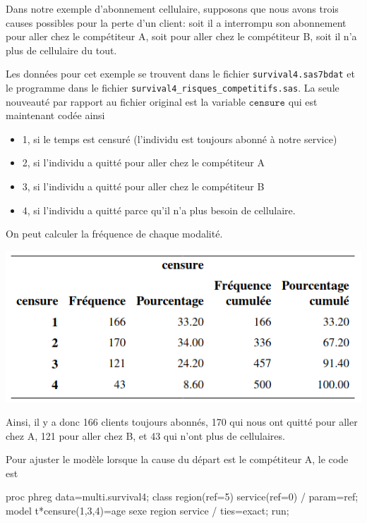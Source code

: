 \documentclass[
  11pt,
  letterpaper,
]{book}
\newenvironment{Shaded}{\begin{snugshade}}{\end{snugshade}}
\newcommand{\NormalTok}[1]{#1}
\providecommand{\tightlist}{%
  \setlength{\itemsep}{0pt}\setlength{\parskip}{0pt}}
\theoremstyle{definition}
\theoremstyle{definition}
\theoremstyle{definition}
\theoremstyle{definition}
\theoremstyle{remark}
\begin{document}
Dans notre exemple d'abonnement cellulaire, supposons que nous avons trois causes possibles pour la perte d'un client: soit il a interrompu son abonnement pour aller chez le compétiteur A, soit pour aller chez le compétiteur B, soit il n'a plus de cellulaire du tout.

Les données pour cet exemple se trouvent dans le fichier \texttt{survival4.sas7bdat} et le programme dans le fichier \texttt{survival4\_risques\_competitifs.sas}. La seule nouveauté par rapport au fichier original est la variable \(\texttt{censure}\) qui est maintenant codée ainsi

\begin{itemize}
\tightlist
\item
  1, si le temps est censuré (l'individu est toujours abonné à notre service)
\item
  2, si l'individu a quitté pour aller chez le compétiteur A
\item
  3, si l'individu a quitté pour aller chez le compétiteur B
\item
  4, si l'individu a quitté parce qu'il n'a plus besoin de cellulaire.
\end{itemize}

On peut calculer la fréquence de chaque modalité.

\begin{center}\includegraphics[width=0.65\linewidth]{figures/05-survie-e23} \end{center}

Ainsi, il y a donc 166 clients toujours abonnés, 170 qui nous ont quitté pour aller chez A, 121 pour aller chez B, et 43 qui n'ont plus de cellulaires.

Pour ajuster le modèle lorsque la cause du départ est le compétiteur A, le code est

\begin{Shaded}
\begin{Highlighting}[]
\NormalTok{proc phreg data=multi.survival4;}
\NormalTok{class region(ref=\textquotesingle{}5\textquotesingle{}) service(ref=\textquotesingle{}0\textquotesingle{}) / param=ref;}
\NormalTok{model t*censure(1,3,4)=age sexe region service / ties=exact; }
\NormalTok{run;}
\end{Highlighting}
\end{Shaded}
\end{document}
